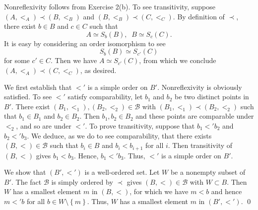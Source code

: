 \documentclass[a4paper,12pt]{article}
\begin{document}
\begin{sol}\leavevmode \par
	Nonreflexivity follows from Exercise 2(b).
	To see transitivity,
	suppose \( (A,<_{A}) \prec (B,<_{B})\) 
	and 
	\( (B,<_{B})  \prec (C,<_{C})\).
	By definition of \( \prec \),
	there exist \( b\in B \) and \(  c\in C \) such that
	\begin{equation*}
		A \simeq S_{b}(B),\;\;B \simeq S_{c}(C).
	\end{equation*}
	It is easy by considering an order isomorphism to see
	\begin{equation*}
		S_{b}(B) \simeq S_{c'}(C)
	\end{equation*}
	for some \( c' \in C \).
	Then we have \( A \simeq S_{c'}(C)\),
	from which we conclude \( (A,<_{A}) \prec (C,<_{C}) \),
	as desired.
	
	We first establish that \( <' \) is a simple order on \( B' \).
	Nonreflexivity is obviously satisfied.
	To see \( <' \) satisfy comparability,
	let \( b_1 \) and \( b_2 \) be two distinct points in \( B' \).
	There exist \( (B_1,<_1), (B_2,<_2) \in \mathcal{B} \)
	with \( (B_1,<_1) \prec  (B_2,<_2) \)
	such that \( b_1 \in B_1 \) and \( b_2 \in B_2 \).
	Then \( b_1, b_2 \in B_2 \) and these points are comparable under \( <_2 \),
	and so are under \( <' \).
	To prove transitivity,
	suppose that \( b_1 <' b_2 \) and \( b_2 <' b_3 \).
	We deduce, as we do to see comparability, that
	there exists \( (B,<) \in \mathcal{B} \) such that
	\( b_i \in B \)
	and
	\( b_{i} < b_{i+1} \)
	for all \( i \).
	Then transitivity of \( (B,<) \) gives \( b_1 < b_3 \).
	Hence, \( b_1 <' b_3 \).
	Thus, \( <' \) is a simple order on \( B' \).
	
	We show that \( (B',<') \) is a well-ordered set.
	Let \( W \) be a nonempty subset of \( B' \).
	The fact \( \mathcal{B} \) is simply ordered by \( \prec \)
	gives \( (B,<) \in \mathcal{B} \) with \( W \subset B \).
	Then \( W \) has a smallest element \( m \) in \( (B,<) \),
	for which we have
	\( m<b \)
	and hence
	\( m<'b \)
	for all \( b\in W \setminus \left\{ m \right\} \).
	Thus, \( W \) has a smallest element \( m \) in \( (B',<') \).
	\qed\end{sol}
\end{document}
